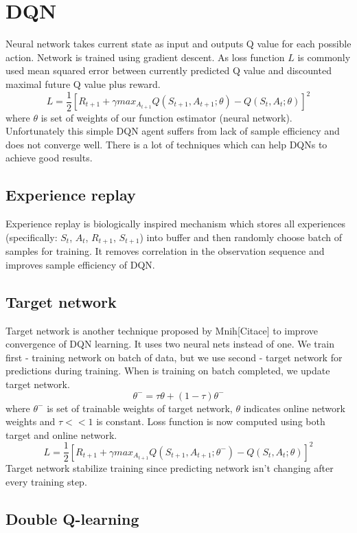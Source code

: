 \section{DQN}
Neural network takes current state as input and outputs Q value for each possible action. Network is trained using gradient descent. As loss function $L$ is commonly used mean squared error between currently predicted Q value and discounted maximal future Q value plus reward.
\begin{equation}
L = \frac{1}{2}[R_{t+1} + \gamma max_{A_{t+1}}Q(S_{t+1}, A_{t+1};\theta) - Q(S_t, A_t;\theta)]^2
\end{equation}
where $\theta$ is set of weights of our function estimator (neural network). Unfortunately this simple DQN agent suffers from lack of sample efficiency and does not converge well. There is a lot of techniques which can help DQNs to achieve good results.

\subsection{Experience replay}
Experience replay is biologically inspired mechanism which stores all experiences (specifically: $S_t$, $A_t$, $R_{t+1}$, $S_{t+1}$) into buffer and then randomly choose batch of samples for training. It removes correlation in the observation sequence and improves sample efficiency of DQN.

\subsection{Target network}
Target network is another technique proposed by Mnih[Citace] to improve convergence of DQN learning. It uses two neural nets instead of one. We train first - training network on batch of data, but we use second - target network for predictions during training. When is training on batch completed, we update target network.
\begin{equation}
\theta^- = \tau \theta + (1-\tau)\theta^-
\end{equation}
where $\theta^-$ is set of trainable weights of target network, $\theta$ indicates online network weights and $\tau << 1$ is constant.
Loss function is now computed using both target and online network.
\begin{equation}
L = \frac{1}{2}[R_{t+1} + \gamma max_{A_{t+1}}Q(S_{t+1}, A_{t+1};\theta^-) - Q(S_t, A_t;\theta)]^2
\end{equation}
Target network stabilize training since predicting network isn't changing after every training step.

\subsection{Double Q-learning}